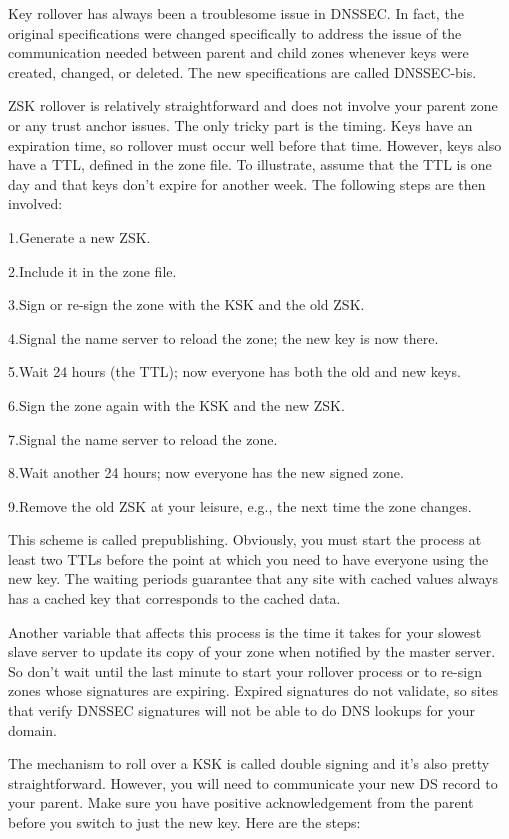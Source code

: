 \protect\hypertarget{part0024_split_066.htmlux5cux23_idIndexMarker2270}{}{}\protect\hypertarget{part0024_split_066.htmlux5cux23_idTextAnchor947}{}{}Key
rollover has always been a troublesome issue in DNSSEC. In fact, the
original specifications were changed specifically to address the issue
of the communication needed between parent and child zones whenever keys
were created, changed, or deleted. The new specifications are called
DNSSEC-bis.

ZSK rollover is relatively straightforward and does not involve your
parent zone or any trust anchor issues. The only tricky part is the
timing. Keys have an expiration time, so rollover must occur well before
that time. However, keys also have a TTL, defined in the zone file. To
illustrate, assume that the TTL is one day and that keys don't expire
for another week. The following steps are then involved:

{1.}Generate a new ZSK.

{2.}Include it in the zone file.

{3.}Sign or re-sign the zone with the KSK and the {old} ZSK.

{4.}Signal the name server to reload the zone; the new key is now there.

{5.}Wait 24 hours (the TTL); now everyone has both the old and new keys.

{6.}Sign the zone again with the KSK and the {new} ZSK.

{7.}Signal the name server to reload the zone.

{8.}Wait another 24 hours; now everyone has the new signed zone.

{9.}Remove the old ZSK at your leisure, e.g., the next time the zone
changes.

This scheme is called prepublishing. Obviously, you must start the
process at least two TTLs before the point at which you need to have
everyone using the new key. The waiting periods guarantee that any site
with cached values always has a cached key that corresponds to the
cached data.

Another variable that affects this process is the time it takes for your
slowest slave server to update its copy of your zone when notified by
the master server. So don't wait until the last minute to start your
rollover process or to re-sign zones whose signatures are expiring.
Expired signatures do not validate, so sites that verify DNSSEC
signatures will not be able to do DNS lookups for your domain.

The mechanism to roll over a KSK is called double signing and it's also
pretty straightforward. However, you will need to communicate your new
DS record to your parent. Make sure you have positive acknowledgement
from the parent before you switch to just the new key. Here are the
steps:

